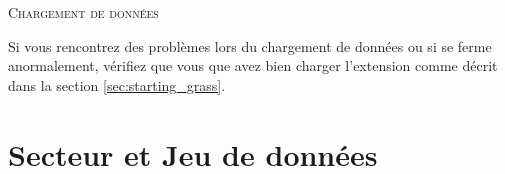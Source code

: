 \begin{Tip}\caption{\textsc{Chargement de données \grass}}
Si vous rencontrez des problèmes lors du chargement de données ou si \qg se ferme anormalement, vérifiez que vous que avez bien charger l'extension \grass comme décrit dans la section \ref{sec:starting_grass}.
\end{Tip}
\section{Secteur et Jeu de données \grass}\label{sec:about_loc}


